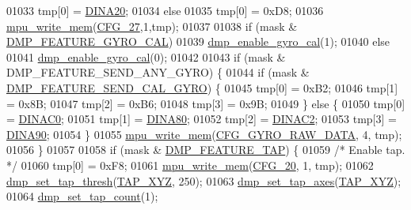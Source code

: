 \begin{DoxyCode}
01033         tmp[0] = \hyperlink{dmp_key_8h_a2b6f6c9e544536e4c10f2a828621b87b}{DINA20};
01034     \textcolor{keywordflow}{else}
01035         tmp[0] = 0xD8;
01036     \hyperlink{group___d_r_i_v_e_r_s_gafea59910bc3dd30ba3356b1c75213a5f}{mpu\_write\_mem}(\hyperlink{group___d_r_i_v_e_r_s_gaae53afa64170cb4723c04f16c2fa5f30}{CFG\_27},1,tmp);
01037 
01038     \textcolor{keywordflow}{if} (mask & \hyperlink{group___d_r_i_v_e_r_s_gaaf0ac890c1f83106c08b722f1e865fdb}{DMP\_FEATURE\_GYRO\_CAL})
01039         \hyperlink{group___d_r_i_v_e_r_s_ga653ebcec6758f006dd89939e8f3c6ebb}{dmp\_enable\_gyro\_cal}(1);
01040     \textcolor{keywordflow}{else}
01041         \hyperlink{group___d_r_i_v_e_r_s_ga653ebcec6758f006dd89939e8f3c6ebb}{dmp\_enable\_gyro\_cal}(0);
01042 
01043     \textcolor{keywordflow}{if} (mask & DMP\_FEATURE\_SEND\_ANY\_GYRO) \{
01044         \textcolor{keywordflow}{if} (mask & \hyperlink{group___d_r_i_v_e_r_s_ga40462c6fd55b04b2f79723dd737ee795}{DMP\_FEATURE\_SEND\_CAL\_GYRO}) \{
01045             tmp[0] = 0xB2;
01046             tmp[1] = 0x8B;
01047             tmp[2] = 0xB6;
01048             tmp[3] = 0x9B;
01049         \} \textcolor{keywordflow}{else} \{
01050             tmp[0] = \hyperlink{dmp_key_8h_a090e2de2c4154541f57ae6b818884cf4}{DINAC0};
01051             tmp[1] = \hyperlink{dmp_key_8h_afc42e54169b23fd9319d59cccde6199f}{DINA80};
01052             tmp[2] = \hyperlink{dmp_key_8h_ac75342203eb32cb43e0f9404accb37a3}{DINAC2};
01053             tmp[3] = \hyperlink{dmp_key_8h_a067d7d3582cec5360b65783c031b8a05}{DINA90};
01054         \}
01055         \hyperlink{group___d_r_i_v_e_r_s_gafea59910bc3dd30ba3356b1c75213a5f}{mpu\_write\_mem}(\hyperlink{group___d_r_i_v_e_r_s_ga01dcbc69fa28559529653a3b4aabea00}{CFG\_GYRO\_RAW\_DATA}, 4, tmp);
01056     \}
01057 
01058     \textcolor{keywordflow}{if} (mask & \hyperlink{group___d_r_i_v_e_r_s_ga87fac39cf95e2c56afdf507a986fa00b}{DMP\_FEATURE\_TAP}) \{
01059         \textcolor{comment}{/* Enable tap. */}
01060         tmp[0] = 0xF8;
01061         \hyperlink{group___d_r_i_v_e_r_s_gafea59910bc3dd30ba3356b1c75213a5f}{mpu\_write\_mem}(\hyperlink{group___d_r_i_v_e_r_s_ga12aa4c3bdc65c24ca29ef08e62fd3e13}{CFG\_20}, 1, tmp);
01062         \hyperlink{group___d_r_i_v_e_r_s_ga15da67c0a6c94e0cdaceb8b165e13af9}{dmp\_set\_tap\_thresh}(\hyperlink{group___d_r_i_v_e_r_s_gaa2b8e1661eb53aeac3ff4877ff2b79d9}{TAP\_XYZ}, 250);
01063         \hyperlink{group___d_r_i_v_e_r_s_ga66bc5c8fc26fcb498df53fc62aa87e4f}{dmp\_set\_tap\_axes}(\hyperlink{group___d_r_i_v_e_r_s_gaa2b8e1661eb53aeac3ff4877ff2b79d9}{TAP\_XYZ});
01064         \hyperlink{group___d_r_i_v_e_r_s_ga819f947b2cb107ada7b9a94c41be0dad}{dmp\_set\_tap\_count}(1);

\end{DoxyCode}
